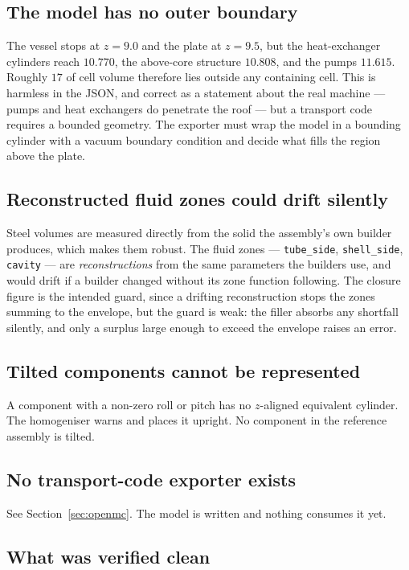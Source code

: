 \documentclass[9pt,a4paper]{extarticle}
\newcommand{\code}[1]{\texttt{\small #1}}
\begin{document}
\subsection{The model has no outer boundary}

The vessel stops at $z=9.0$ and the plate at $z=9.5$, but the heat-exchanger
cylinders reach $10.770$, the above-core structure $10.808$, and the pumps
$11.615$. Roughly $17$ of cell volume therefore lies outside any containing
cell. This is harmless in the JSON, and correct as a statement about the real
machine --- pumps and heat exchangers do penetrate the roof --- but a transport
code requires a bounded geometry. The exporter must wrap the model in a bounding
cylinder with a vacuum boundary condition and decide what fills the region above
the plate.

\subsection{Reconstructed fluid zones could drift silently}

Steel volumes are measured directly from the solid the assembly's own builder
produces, which makes them robust. The fluid zones --- \code{tube\_side},
\code{shell\_side}, \code{cavity} --- are \emph{reconstructions} from the same
parameters the builders use, and would drift if a builder changed without its
zone function following. The closure figure is the intended guard, since a
drifting reconstruction stops the zones summing to the envelope, but the guard
is weak: the filler absorbs any shortfall silently, and only a surplus large
enough to exceed the envelope raises an error.

\subsection{Tilted components cannot be represented}

A component with a non-zero roll or pitch has no $z$-aligned equivalent
cylinder. The homogeniser warns and places it upright. No component in the
reference assembly is tilted.

\subsection{No transport-code exporter exists}

See Section~\ref{sec:openmc}. The model is written and nothing consumes it yet.

\subsection{What was verified clean}
\end{document}
